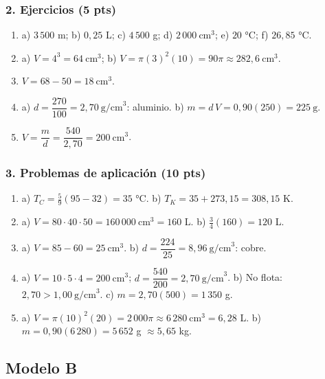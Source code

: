 \documentclass[12pt, letterpaper]{article}
\begin{document}
\subsubsection*{2. Ejercicios (5 pts)}
\begin{enumerate}[leftmargin=*, label=\textbf{\arabic*.}, itemsep=0.35em]
  \item a) $3\,500$ m; \quad b) $0{,}25$ L; \quad c) $4\,500$ g; \quad
        d) $2\,000\ \text{cm}^3$; \quad e) $20$ °C; \quad f) $26{,}85$ °C.
  \item a) $V=4^3=64\ \text{cm}^3$; \quad
        b) $V=\pi(3)^2(10)=90\pi\approx282{,}6\ \text{cm}^3$.
  \item $V=68-50=18\ \text{cm}^3$.
  \item a) $d=\dfrac{270}{100}=2{,}70\ \text{g/cm}^3$: aluminio. \quad
        b) $m=d\,V=0{,}90(250)=225\ \text{g}$.
  \item $V=\dfrac{m}{d}=\dfrac{540}{2{,}70}=200\ \text{cm}^3$.
\end{enumerate}

\subsubsection*{3. Problemas de aplicación (10 pts)}
\begin{enumerate}[leftmargin=*, label=\textbf{\arabic*.}, itemsep=0.35em]
  \item a) $T_C=\frac{5}{9}(95-32)=35$ °C. \quad
        b) $T_K=35+273{,}15=308{,}15$ K.
  \item a) $V=80\cdot40\cdot50=160\,000\ \text{cm}^3=160$ L. \quad
        b) $\frac{3}{4}(160)=120$ L.
  \item a) $V=85-60=25\ \text{cm}^3$. \quad
        b) $d=\dfrac{224}{25}=8{,}96\ \text{g/cm}^3$: cobre.
  \item a) $V=10\cdot5\cdot4=200\ \text{cm}^3$;
        $d=\dfrac{540}{200}=2{,}70\ \text{g/cm}^3$. \quad
        b) No flota: $2{,}70>1{,}00\ \text{g/cm}^3$. \quad
        c) $m=2{,}70(500)=1\,350$ g.
  \item a) $V=\pi(10)^2(20)=2\,000\pi\approx6\,280\ \text{cm}^3=6{,}28$ L. \quad
        b) $m=0{,}90(6\,280)=5\,652$ g $\approx5{,}65$ kg.
\end{enumerate}

\subsection*{Modelo B}
\end{document}
